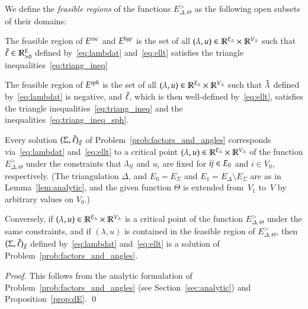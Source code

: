 \documentclass[Thesis]{subfiles}
\begin{document}
\begin{definition}
  We define the \emph{feasible regions}\/ of the functions
  $E_{\Delta,\Theta}^{\gt}$ as the following open subsets of their
  domains:
  \begin{compactitem}
  \item The feasible region of $E^{\euc}$ and $E^{\mathit{hyp}}$ is the set of
    all $(\lambda, u)\in\mathbb R^{E_{\Delta}}\times\mathbb R^{V_{\Delta}}$ such
    that $\tilde{\ell}\in\mathbb R_{>0}^{E}$ defined by~\eqref{eq:lambdat}
    and~\eqref{eq:ellt} satisfies the triangle
    inequalities~\eqref{eq:triang_ineq}
  \item The feasible region of $E^{\mathit{sph}}$ is the set of all $(\lambda,
    u)\in\mathbb R^{E_{\Delta}}\times\mathbb R^{V_{\Delta}}$ such that $\tilde{\lambda}$
    defined by~\eqref{eq:lambdat} is negative, and $\tilde{\ell}$, which is
    then well-defined by~\eqref{eq:ellt}, satisfies the triangle
    inequalities~\eqref{eq:triang_ineq} and the
    inequalities~\eqref{eq:triang_ineq_sph}.  
  \end{compactitem}
\end{definition}

\begin{theorem}
  \label{thm:variational}
  Every solution $(\Sigma,\tilde{\ell})_{\tilde{g}}$ of
  Problem~\ref{prob:factors_and_angles} corresponds
  via~\eqref{eq:lambdat} and~\eqref{eq:ellt} to a critical point\/
  $(\lambda, u)\in\mathbb R^{E_{\Delta}}\times\mathbb R^{V_{\Delta}}$ of the
  function $E^{\gt}_{\Delta,\Theta}$ under the constraints that
  $\lambda_{\it ij}$ and $u_{i}$ are fixed for ${\it ij}\in E_{0}$ and
  $i\in V_{0}$, respectively. (The triangulation $\Delta$, and
  $E_{0}=E_{\Sigma}$ and $E_{1}=E_{\Delta}\setminus E_{\Sigma}$ are as
  in Lemma~\ref{lem:analytic}, and the given function $\Theta$ is
  extended from~$V_{1}$ to~$V$ by arbitrary values on $V_{0}$.)

  Conversely, if\/ $(\lambda,
  u)\in\mathbb R^{E_{\Delta}}\times\mathbb R^{V_{\Delta}}$ is a critical point of
  the function $E^{\gt}_{\Delta,\Theta}$ under the same constraints,
  and if\/ $(\lambda, u)$ is contained in the feasible region of
  $E^{\gt}_{\Delta,\Theta}$, then\/ $(\Sigma,\tilde{\ell})_{\tilde{g}}$ defined
  by~\eqref{eq:lambdat} and~\eqref{eq:ellt} is a solution of
  Problem~\ref{prob:factors_and_angles}.
\end{theorem}

\begin{proof}
  This follows from the analytic formulation of
  Problem~\ref{prob:factors_and_angles} (see Section~\ref{sec:analytic}) and
  Proposition~\ref{prop:dE}.
  \qed
\end{proof}
\end{document}
